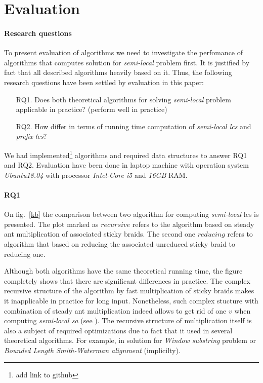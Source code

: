 \section{Evaluation}
\label{section:evaluation}

\paragraph{Research questions}
To present evaluation of algorithms we need to investigate the perfomance of algorithms that computes solution for \emph{semi-local} problem first.
It is justified by fact that all described algorithms heavily based on it.
Thus, the following research questions have been settled by evaluation in this paper:
\begin{enumerate}
\item[RQ1.] Does both theoretical algorithms for solving \emph{semi-local} problem applicable in practice? (perform well in practice)
\item[RQ2.] How differ in terms of running time computation of \emph{semi-local lcs} and \emph{prefix lcs}?
\end{enumerate}

We had implemented\footnote{add link to github} algorithms and required data structures to answer RQ1 and RQ2.
Evaluation have been done in laptop machine with operation system \emph{Ubuntu18.04} with processor \emph{Intel-Core i5} and \emph{16GB} RAM.

\paragraph{RQ1}

On  fig.~\ref{kb} the comparison between two algorithm for computing \emph{semi-local} lcs is presented.
The plot marked as $recursive$ refers to the algorithm based on steady ant multiplication of associated sticky braids.
The second one $reducing$ refers to algorithm that based on reducing the associated unreduced sticky braid to reducing one.

Although both algorithms have the same theoretical running time, the figure completely shows that there are significant differences in practice.
The complex recursive structure of the algorithm by fast multiplication of sticky braids makes it inapplicable in practice for long input.
Nonetheless, such complex stucture with combination of steady ant multiplication indeed allows to get rid of one $v$ when computing \emph{semi-local sa} (see ).
The recursive structure of multiplication itself is also a subject of required optimizations due to fact that it used in several theoretical algorithms.
For example, in solution for \emph{Window substring} problem or \emph{Bounded Length Smith-Waterman alignment} (implicilty).  

